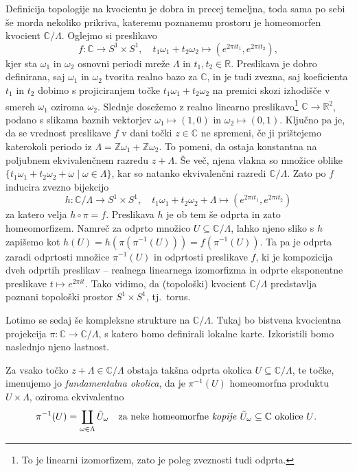 \documentclass[mat1]{fmfdelo}
\numberwithin{equation}{section}
\newcommand{\R}{\mathbb R}
\newcommand{\Z}{\mathbb Z}
\newcommand{\C}{\mathbb C}
\newcommand{\om}{\omega}
\newcommand{\inv}{^{-1}}
\newcommand{\torus}{\C/\Lambda}
\newcommand{\tj}{tj.\ }
\theoremstyle{definition}
\begin{document}
Definicija topologije na kvocientu je dobra in precej temeljna, toda sama po sebi še morda nekoliko prikriva, kateremu poznanemu prostoru je homeomorfen kvocient $\C/\Lambda$. Oglejmo si preslikavo 
\[ 
    f: \C \to S^1 \times S^1, \quad t_1\om_1 + t_2\om_2 \mapsto (e^{2 \pi i t_1}, e^{2 \pi i t_2}),
\]
kjer sta $\om_1$ in $\om_2$ osnovni periodi mreže $\Lambda$ in $t_1, t_2 \in \R$. Preslikava je dobro definirana, saj $\om_1$ in $\om_2$ tvorita realno bazo za $\C$, in je tudi zvezna, saj koeficienta $t_1$ in $t_2$ dobimo s projiciranjem točke $t_1\om_1 + t_2\om_2$ na premici skozi izhodišče v smereh $\om_1$ oziroma $\om_2$. Slednje dosežemo z realno linearno preslikavo\footnote{To je linearni izomorfizem, zato je poleg zveznosti tudi odprta.} $\C \to \R^2$, podano s slikama baznih vektorjev $\om_1 \mapsto (1,0)$ in $\om_2 \mapsto (0,1)$. Ključno pa je, da se vrednost preslikave $f$ v dani točki $z \in \C$ ne spremeni, če ji prištejemo katerokoli periodo iz $\Lambda = \Z\om_1 + \Z\om_2$. To pomeni, da ostaja konstantna na poljubnem ekvivalenčnem razredu $z + \Lambda$. Še več, njena vlakna so množice oblike $\{t_1\om_1 + t_2\om_2 + \om \mid \om \in \Lambda\}$, kar so natanko ekvivalenčni razredi $\C/\Lambda$. Zato po \cite[trditev 3.22]{MrcunTop} $f$ inducira zvezno bijekcijo 
\[
    h: \C/\Lambda \to S^1 \times S^1, \quad t_1\om_1 + t_2\om_2 + \Lambda \mapsto (e^{2 \pi i t_1}, e^{2 \pi i t_2})
\]
za katero velja $h \circ \pi = f$. Preslikava $h$ je ob tem še odprta in zato homeomorfizem. Namreč za odprto množico $U\subseteq \C/\Lambda$, lahko njeno sliko s $h$ zapišemo kot $h(U) = h(\pi(\pi\inv(U))) = f(\pi\inv(U))$. Ta pa je odprta zaradi odprtosti množice $\pi\inv(U)$ in odprtosti preslikave $f$, ki je kompozicija dveh odprtih preslikav -- realnega linearnega izomorfizma in odprte eksponentne preslikave $t \mapsto e^{2\pi i t}$. Tako vidimo, da (topološki) kvocient $\C/\Lambda$ predstavlja poznani topološki prostor $S^1 \times S^1$, \tj torus.

Lotimo se sedaj še kompleksne strukture na $\torus$. Tukaj bo bistvena kvocientna projekcija $\pi: \C \to \torus$, s katero bomo definirali lokalne karte. Izkoristili bomo naslednjo njeno lastnost. 

\begin{lema}
    \label{pi je krovna}
    Za vsako točko $z + \Lambda \in \torus$ obstaja takšna odprta okolica $U \subseteq \torus$, te točke, imenujemo jo \emph{fundamentalna okolica}, da je $\pi\inv(U)$ homeomorfna produktu $U \times \Lambda$, oziroma ekvivalentno 
    \[
        \pi\inv(U) = \coprod_{\om \in \Lambda} \tilde{U}_\om \quad \text{za neke homeomorfne \emph{kopije} $\tilde{U}_\om \subseteq \C$ okolice $U$. } 
    \]
\end{lema}
\end{document}
